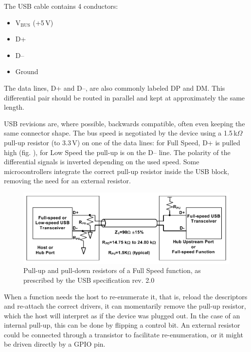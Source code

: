 The USB cable contains 4 conductors:

\begin{itemize}\setlength\itemsep{.2em}
	\item V$_\mathrm{BUS}$ (+5\,V)
	\item D+
	\item D--
	\item Ground
\end{itemize}

The data lines, D+ and D--, are also commonly labeled DP and DM. This differential pair should be routed in parallel and kept at approximately the same length.

USB revisions are, where possible, backwards compatible, often even keeping the same connector shape. The bus speed is negotiated by the device using a 1.5\,k$\Omega$ pull-up resistor (to 3.3\,V) on one of the data lines: for Full Speed, D+ is pulled high (fig. \label{fig:usb-pullup-fs}), for Low Speed the pull-up is on the D-- line. The polarity of the differential signals is inverted depending on the used speed. Some microcontrollers integrate the correct pull-up resistor inside the USB block, removing the need for an external resistor.


\begin{figure}
	\centering
	\includegraphics[width=\textwidth]{img/usb-pullup-fs.png}
	\caption{\label{fig:usb-pullup-fs}Pull-up and pull-down resistors of a Full Speed function, as prescribed by the USB specification rev. 2.0}
\end{figure}

When a function needs the host to re-enumerate it, that is, reload the descriptors and re-attach the correct drivers, it can momentarily remove the pull-up resistor, which the host will interpret as if the device was plugged out. In the case of an internal pull-up, this can be done by flipping a control bit. An external resistor could be connected through a transistor to facilitate re-enumeration, or it might be driven directly by a GPIO pin. 


